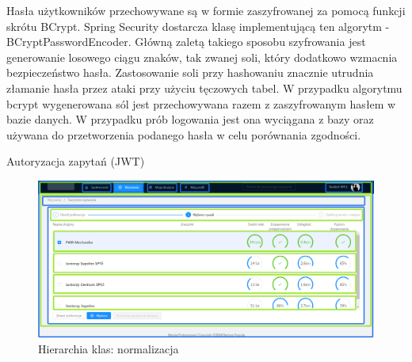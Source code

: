 Hasła użytkowników przechowywane są w formie zaszyfrowanej za pomocą funkcji skrótu BCrypt. Spring Security dostarcza klasę implementującą ten algorytm - BCryptPasswordEncoder. Główną zaletą takiego sposobu szyfrowania jest generowanie losowego ciągu znaków, tak zwanej soli, który dodatkowo wzmacnia bezpieczeństwo hasła. Zastosowanie soli przy hashowaniu znacznie utrudnia złamanie hasła przez ataki przy użyciu tęczowych tabel. W przypadku algorytmu bcrypt wygenerowana sól jest przechowywana razem z zaszyfrowanym hasłem w bazie danych. W przypadku prób logowania jest ona wyciągana z bazy oraz używana do przetworzenia podanego hasła w celu porównania zgodności.


Autoryzacja zapytań (JWT)


\begin{figure}[H]
\centering
\includegraphics[width=0.7\linewidth]{06-implementacja/rys/modularyzacja.PNG}
\caption{Hierarchia klas: normalizacja}
\label{fig:criterion-classes}
\end{figure}